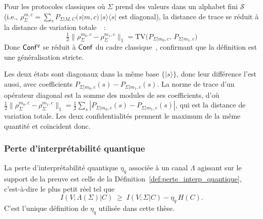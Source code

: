\begin{sloppypar}
\begin{remark}\label{rem:compatibilite_classique}
Pour les protocoles classiques o\`u $\Sigma$ prend des valeurs dans un alphabet
fini $\mathcal{S}$ (i.e., $\rho_\Sigma^{m,c} = \sum_{s} P_{\Sigma|M,C}(s|m,c)\,|s\rangle\langle s|$
est diagonal), la distance de trace se r\'eduit \`a la distance de variation
totale~\cite{Levin,Pinsker1964}~:
\begin{equation}
\tfrac{1}{2}\|\rho_\Sigma^{m_0,c} - \rho_\Sigma^{m_1,c}\|_1
= \mathrm{TV}\!\bigl(P_{\Sigma|m_0,c},\, P_{\Sigma|m_1,c}\bigr)
\end{equation}
Donc $\mathsf{Conf}^q$ se r\'eduit \`a $\mathsf{Conf}$ du cadre classique~\cite{MINKA2026CLO},
confirmant que la d\'efinition est une g\'en\'eralisation stricte.
\end{remark}

\begin{Preuve}
Les deux \'etats sont diagonaux dans la m\^eme base $\{|s\rangle\}$, donc leur
diff\'erence l'est aussi, avec coefficients $P_{\Sigma|m_0,c}(s) - P_{\Sigma|m_1,c}(s)$.
La norme de trace d'un op\'erateur diagonal est la somme des modules de ses
coefficients, d'o\`u
$\tfrac12\|\rho_\Sigma^{m_0,c} - \rho_\Sigma^{m_1,c}\|_1 = \tfrac12\sum_s|P_{\Sigma|m_0,c}(s) - P_{\Sigma|m_1,c}(s)|$,
qui est la distance de variation totale. Les deux confidentialit\'es prennent le
maximum de la m\^eme quantit\'e et co\"incident donc.
\end{Preuve}

\subsubsection{Perte d'interpr\'etabilit\'e quantique}
\label{subsubsec:perte_interpretabilite_quantique}

\begin{definition}\label{def:perte_interp_quantique_pq}
La perte d'interpr\'etabilit\'e quantique $\eta_q$ associ\'ee \`a un
canal $\Lambda$ agissant sur le support de la preuve est celle de la
D\'efinition~\ref{def:perte_interp_quantique}, c'est-\`a-dire le plus petit r\'eel tel que
\begin{equation}
I(V;\Lambda(\Sigma)|C) \;\geq\; I(V;\Sigma|C) - \eta_q\, H(C).
\label{eq:eta_q_definition}
\end{equation}
C'est l'unique d\'efinition de $\eta_q$ utilis\'ee dans cette th\`ese.
\end{definition}


\end{sloppypar}
